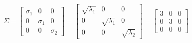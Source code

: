 \documentclass[a4paper, spanish]{article}
\begin{document}
  \begin{align}
    \Sigma =
    \begin{bmatrix}
      \sigma_1 & 0  & 0\\
      0 & \sigma_1  & 0 \\
      0 & 0 & \sigma_2
    \end{bmatrix}
    =
    \begin{bmatrix}
      \sqrt{\lambda_1} & 0 & 0 \\
      0 & \sqrt{\lambda_1} & 0\\
      0 & 0 & \sqrt{\lambda_2}
    \end{bmatrix} =
    \begin{bmatrix}
      3 & 0 & 0 \\
      0 & 3 & 0 \\
      0 & 0 & 0
    \end{bmatrix}
  \end{align}
\end{document}
